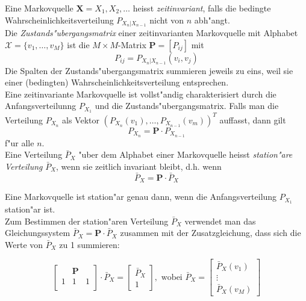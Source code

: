 \documentclass[german, 10pt, a4paper, twocolumn]{scrartcl}
\begin{document}
Eine Markovquelle $\mathbf{X}=X_1,X_2,\ldots$ heisst \textit{zeitinvariant}, falls die bedingte Wahrscheinlichkeitsverteilung $P_{X_n|X_{n-1}}$ nicht von $n$ abh"angt.\\

Die \textit{Zustands"ubergangsmatrix} einer zeitinvarianten Markovquelle mit Alphabet $\mathcal{X}=\{v_1,\ldots,v_M\}$ ist die $M\times M$-Matrix $\mathbf{P}=[P_{ij}]$ mit
\begin{displaymath}
	P_{ij} = P_{X_n|X_{n-1}}(v_i,v_j)
\end{displaymath}
Die Spalten der Zustands"ubergangsmatrix summieren jeweils zu eins, weil sie einer (bedingten) Wahrscheinlichkeitsverteilung entsprechen.\\

Eine zeitinvariante Markovquelle ist vollst"andig charakterisiert durch die Anfangsverteilunng $P_{X_1}$ und die Zustands"ubergangsmatrix. Falls man die Verteilung $P_{X_n}$ als Vektor $(P_{X_n}(v_1),\ldots,P_{X_{n-1}}(v_m))^T$ auffasst, dann gilt
\begin{displaymath}
	P_{X_n} = \mathbf{P}\cdotp P_{X_{n-1}}
\end{displaymath}
f"ur alle $n$.\\

Eine Verteilung $\bar{P}_X$ "uber dem Alphabet einer Markovquelle heisst \textit{station"are Verteilung} $\bar{P}_X$, wenn sie zeitlich invariant bleibt, d.h. wenn
\begin{displaymath}
	\bar{P}_X = \mathbf{P} \cdotp \bar{P}_X
\end{displaymath}

Eine Markovquelle ist station"ar genau dann, wenn die Anfangsverteilung $P_{X_1}$ station"ar ist.\\

Zum Bestimmen der station"aren Verteilung $\bar{P}_X$ verwendet man das Gleichungssystem $\bar{P}_X = \mathbf{P}\cdotp \bar{P}_X$ zusammen mit der Zusatzgleichung, dass sich die Werte von $\bar{P}_X$ zu 1 summieren:

\begin{displaymath}
	\left [
		\begin{array}{ccc}
			&	\mathbf{P} &	\\
			1 &	1 &		1\\
		\end{array}
	\right ] \cdotp
	\bar{P}_X =
	\left [
		\begin{array}{c}
			\bar{P}_X \\
			1
		\end{array}
	\right ], \mbox{ wobei } \bar{P}_X =
	\left [
		\begin{array}{c}
			\bar{P}_X(v_1)\\
			\vdots\\
			 \bar{P}_X(v_M)
		\end{array}
	\right ]
\end{displaymath}
\end{document}
